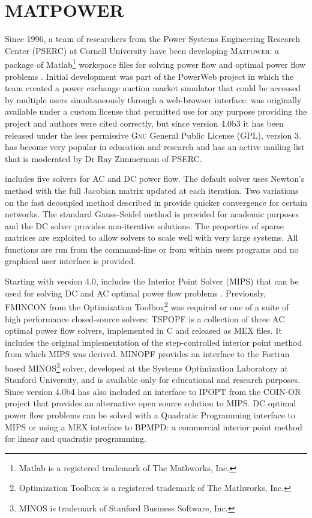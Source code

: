 \section{MATPOWER}
Since 1996, a team of researchers from the Power Systems Engineering Research
Center (PSERC) at Cornell University have been developing \textsc{Matpower}: a
package of Matlab\footnote{Matlab is a registered trademark of The Mathworks,
Inc.} workspace files for solving power flow and optimal power flow problems
\cite{zimmerman:mp_pes}. Initial development was part of the PowerWeb project in
which the team created a power exchange auction market simulator that could be
accessed by multiple users simultaneously through a web-browser interface.
\matpower was originally available under a custom license that permitted use for
any purpose providing the project and authors were cited correctly, but since
version 4.0b3 it has been released under the less permissive \textsc{Gnu}
General Public License (GPL), version 3. \matpower has become very popular in
education and research and has an active mailing list that is moderated by Dr
Ray Zimmerman of PSERC.

\matpower includes five solvers for AC and DC power flow.  The default solver
uses Newton's method \cite{tinney:67} with the full Jacobian matrix updated at
each iteration.  Two variations on the fast decoupled method \cite{stott:74}
described in  provide quicker convergence for certain
networks.  The standard Gauss-Seidel method \cite{glimn:57} is provided for
academic purposes and the DC solver provides non-iterative solutions.  The
properties of \matlab sparse matrices are exploited to allow solvers to scale
well with very large systems.  All functions are run from the \matlab
command-line or from within users programs and no graphical user interface is
provided.

Starting with version 4.0, \matpower includes the \matlab Interior Point Solver
(MIPS) that can be used for solving DC and AC optimal power flow problems
\cite{zimmerman:ccv}.  Previously, FMINCON from the \matlab Optimization
Toolbox\footnote{Optimization Toolbox is a registered trademark of The
Mathworks, Inc.} was required or one of a suite of high performance
closed-source solvers:  TSPOPF is a collection of three AC optimal power flow
solvers, implemented in C and released as \matlab MEX files.  It includes the
original implementation of the step-controlled interior point method from which
MIPS was derived.  MINOPF provides an interface to the Fortran based
MINOS\footnote{MINOS is trademark of Stanford Business Software, Inc.} solver,
developed at the Systems Optimization Laboratory at Stanford University, and is
available only for educational and research purposes. Since version 4.0b4
\matpower has also included an interface to IPOPT from the COIN-OR project that
provides an alternative open source solution to MIPS.  DC optimal power flow
problems can be solved with a Quadratic Programming interface to MIPS or using a
MEX interface to BPMPD: a commercial interior point method for linear and
quadratic programming.

